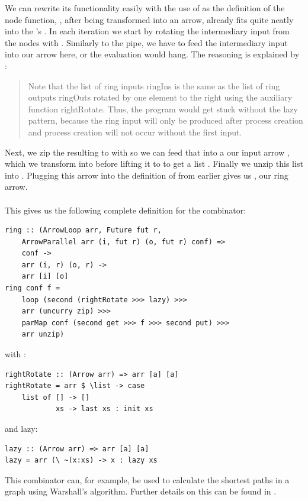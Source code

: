 We can rewrite its functionality easily with the use of  as the definition of the node function, , after being transformed into an arrow, already fits quite neatly into the 's . In each iteration we start by rotating the intermediary input from the nodes \code{[fut r]} with . Similarly to the pipe, we have to feed the intermediary input into our  arrow here, or the evaluation would hang. The reasoning is explained by \cite{eden_cefp}:
\begin{quotation}
Note that the list of ring inputs ringIns is the same as the list of ring outputs ringOuts rotated by one element to the right using the auxiliary function rightRotate. Thus, the program would get stuck without the lazy pattern, because the ring input will only be produced after process creation and process creation will not occur without the first input.
\end{quotation}
Next, we zip the resulting \code{([i], [fut r])} to \code{[(i, fut r)]} with  so we can feed that into a our input arrow , which we transform into  before lifting it to  to get a list \code{[(o, fut r)]}. Finally we unzip this list into \code{([o], [fut r])}. Plugging this arrow  into the definition of  from earlier gives us , our ring arrow.
\\\\
This gives us the following complete definition for the  combinator:
\begin{lstlisting}[frame=htrbl]
ring :: (ArrowLoop arr, Future fut r,
	ArrowParallel arr (i, fut r) (o, fut r) conf) =>
    conf ->
    arr (i, r) (o, r) ->
    arr [i] [o]
ring conf f =
	loop (second (rightRotate >>> lazy) >>>
    arr (uncurry zip) >>>
    parMap conf (second get >>> f >>> second put) >>>
    arr unzip)
\end{lstlisting}
with :
\begin{lstlisting}[frame=htrbl]
rightRotate :: (Arrow arr) => arr [a] [a]
rightRotate = arr $ \list -> case
	list of [] -> []
			xs -> last xs : init xs
\end{lstlisting}
and lazy:
\begin{lstlisting}[frame=htrbl]			
lazy :: (Arrow arr) => arr [a] [a]
lazy = arr (\ ~(x:xs) -> x : lazy xs
\end{lstlisting}
This combinator can, for example, be used to calculate the shortest paths in a graph using Warshall's algorithm. Further details on this can be found in \cite{eden_cefp}.
